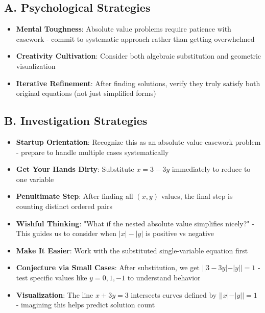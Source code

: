 \documentclass[]{article}
\begin{document}
\begin{strategicbox}
\subsection*{A. Psychological Strategies}
\begin{itemize}[leftmargin=*]
    \item \textbf{Mental Toughness}: Absolute value problems require patience with casework - commit to systematic approach rather than getting overwhelmed
    \item \textbf{Creativity Cultivation}: Consider both algebraic substitution and geometric visualization
    \item \textbf{Iterative Refinement}: After finding solutions, verify they truly satisfy both original equations (not just simplified forms)
\end{itemize}

\subsection*{B. Investigation Strategies}
\begin{itemize}[leftmargin=*]
    \item \textbf{Startup Orientation}: Recognize this as an absolute value casework problem - prepare to handle multiple cases systematically
    \item \textbf{Get Your Hands Dirty}: Substitute $x = 3-3y$ immediately to reduce to one variable
    \item \textbf{Penultimate Step}: After finding all $(x,y)$ values, the final step is counting distinct ordered pairs
    \item \textbf{Wishful Thinking}: "What if the nested absolute value simplifies nicely?" - This guides us to consider when $|x|-|y|$ is positive vs negative
    \item \textbf{Make It Easier}: Work with the substituted single-variable equation first
    \item \textbf{Conjecture via Small Cases}: After substitution, we get $||3-3y| - |y|| = 1$ - test specific values like $y=0, 1, -1$ to understand behavior
    \item \textbf{Visualization}: The line $x+3y=3$ intersects curves defined by $||x|-|y||=1$ - imagining this helps predict solution count
\end{itemize}


\end{strategicbox}
\end{document}
